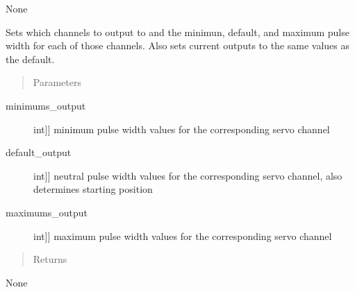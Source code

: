 \documentclass[letterpaper,10pt,english]{sphinxmanual}
\begin{document}
\begin{fulllineitems}
\begin{fulllineitems}
\sphinxAtStartPar
None

\end{fulllineitems}


\begin{fulllineitems}
\label{\detokenize{generic:DigitalOutputObject.DigitalOutputObject.set_outputs}}
\sphinxAtStartPar
Sets which channels to output to and the minimun, default, and maximum pulse width for each of those channels.
Also sets current outputs to the same values as the default.
\begin{quote}\begin{description}
\item[{Parameters}] \leavevmode
\end{description}\end{quote}
\begin{description}
\item[{minimums\_output}] \leavevmode{[}{[}int{]}{]}
\sphinxAtStartPar
minimum pulse width values for the corresponding servo channel

\item[{default\_output}] \leavevmode{[}{[}int{]}{]}
\sphinxAtStartPar
neutral pulse width values for the corresponding servo channel, also determines starting position

\item[{maximums\_output}] \leavevmode{[}{[}int{]}{]}
\sphinxAtStartPar
maximum pulse width values for the corresponding servo channel

\end{description}
\begin{quote}\begin{description}
\item[{Returns}] \leavevmode
\end{description}\end{quote}

\sphinxAtStartPar
None

\end{fulllineitems}


\end{fulllineitems}
\end{document}
